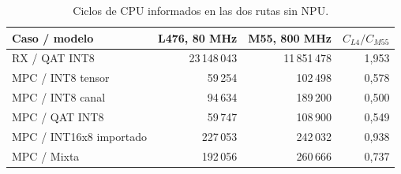 \begin{table}[H]
\centering\small
\caption{Ciclos de CPU informados en las dos rutas sin NPU.}\label{tab:comparacion_ciclos}
\begin{tabularx}{\linewidth}{Yrrr}\toprule
Caso / modelo & L476, 80 MHz & M55, 800 MHz & $C_{L4}/C_{M55}$\\\midrule
RX / QAT INT8 & 23\,148\,043 & 11\,851\,478 & 1,953\\
MPC / INT8 tensor & 59\,254 & 102\,498 & 0,578\\
MPC / INT8 canal & 94\,634 & 189\,200 & 0,500\\
MPC / QAT INT8 & 59\,747 & 108\,900 & 0,549\\
MPC / INT16x8 importado & 227\,053 & 242\,032 & 0,938\\
MPC / Mixta & 192\,056 & 260\,666 & 0,737\\
\bottomrule\end{tabularx}
\end{table}
